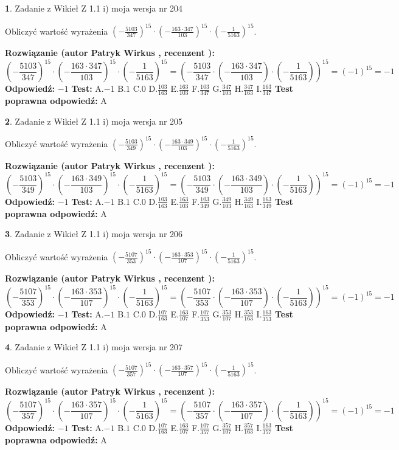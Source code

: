 \documentclass[12pt, a4paper]{article}
\theoremstyle{definition} %
\newtheorem{zad}{}
\newcommand{\zadStart}[1]{\begin{zad}#1\newline}
\newcommand{\zadStop}{\end{zad}}
\newcommand{\rozwStart}[2]{\noindent \textbf{Rozwiązanie (autor #1 , recenzent #2): }\newline}
\newcommand{\rozwStop}{\newline}
\newcommand{\odpStart}{\noindent \textbf{Odpowiedź:}\newline}
\newcommand{\odpStop}{\newline}
\newcommand{\testStart}{\noindent \textbf{Test:}\newline}
\newcommand{\testStop}{\newline}
\newcommand{\kluczStart}{\noindent \textbf{Test poprawna odpowiedź:}\newline}
\newcommand{\kluczStop}{\newline}
\begin{document}
\zadStart{Zadanie z Wikieł Z 1.1 i) moja wersja nr 204}

Obliczyć wartość wyrażenia $(-\frac{5103}{347})^{15} \cdot (-\frac{163 \cdot 347}{103})^{15} \cdot (-\frac{1}{5163})^{15}$.
\zadStop
\rozwStart{Patryk Wirkus}{}
$$(-\frac{5103}{347})^{15} \cdot (-\frac{163 \cdot 347}{103})^{15} \cdot (-\frac{1}{5163})^{15} = (-\frac{5103}{347} \cdot (-\frac{163 \cdot 347}{103}) \cdot (-\frac{1}{5163}))^{15} = (-1)^{15} = -1$$
\rozwStop
\odpStart
$-1$
\odpStop
\testStart
A.$-1$ B.$1$ C.$0$ D.$\frac{103}{163}$ E.$\frac{163}{103}$
F.$\frac{103}{347}$ G.$\frac{347}{103}$
H.$\frac{347}{163}$
I.$\frac{163}{347}$
\testStop
\kluczStart
A
\kluczStop



\zadStart{Zadanie z Wikieł Z 1.1 i) moja wersja nr 205}

Obliczyć wartość wyrażenia $(-\frac{5103}{349})^{15} \cdot (-\frac{163 \cdot 349}{103})^{15} \cdot (-\frac{1}{5163})^{15}$.
\zadStop
\rozwStart{Patryk Wirkus}{}
$$(-\frac{5103}{349})^{15} \cdot (-\frac{163 \cdot 349}{103})^{15} \cdot (-\frac{1}{5163})^{15} = (-\frac{5103}{349} \cdot (-\frac{163 \cdot 349}{103}) \cdot (-\frac{1}{5163}))^{15} = (-1)^{15} = -1$$
\rozwStop
\odpStart
$-1$
\odpStop
\testStart
A.$-1$ B.$1$ C.$0$ D.$\frac{103}{163}$ E.$\frac{163}{103}$
F.$\frac{103}{349}$ G.$\frac{349}{103}$
H.$\frac{349}{163}$
I.$\frac{163}{349}$
\testStop
\kluczStart
A
\kluczStop



\zadStart{Zadanie z Wikieł Z 1.1 i) moja wersja nr 206}

Obliczyć wartość wyrażenia $(-\frac{5107}{353})^{15} \cdot (-\frac{163 \cdot 353}{107})^{15} \cdot (-\frac{1}{5163})^{15}$.
\zadStop
\rozwStart{Patryk Wirkus}{}
$$(-\frac{5107}{353})^{15} \cdot (-\frac{163 \cdot 353}{107})^{15} \cdot (-\frac{1}{5163})^{15} = (-\frac{5107}{353} \cdot (-\frac{163 \cdot 353}{107}) \cdot (-\frac{1}{5163}))^{15} = (-1)^{15} = -1$$
\rozwStop
\odpStart
$-1$
\odpStop
\testStart
A.$-1$ B.$1$ C.$0$ D.$\frac{107}{163}$ E.$\frac{163}{107}$
F.$\frac{107}{353}$ G.$\frac{353}{107}$
H.$\frac{353}{163}$
I.$\frac{163}{353}$
\testStop
\kluczStart
A
\kluczStop



\zadStart{Zadanie z Wikieł Z 1.1 i) moja wersja nr 207}

Obliczyć wartość wyrażenia $(-\frac{5107}{357})^{15} \cdot (-\frac{163 \cdot 357}{107})^{15} \cdot (-\frac{1}{5163})^{15}$.
\zadStop
\rozwStart{Patryk Wirkus}{}
$$(-\frac{5107}{357})^{15} \cdot (-\frac{163 \cdot 357}{107})^{15} \cdot (-\frac{1}{5163})^{15} = (-\frac{5107}{357} \cdot (-\frac{163 \cdot 357}{107}) \cdot (-\frac{1}{5163}))^{15} = (-1)^{15} = -1$$
\rozwStop
\odpStart
$-1$
\odpStop
\testStart
A.$-1$ B.$1$ C.$0$ D.$\frac{107}{163}$ E.$\frac{163}{107}$
F.$\frac{107}{357}$ G.$\frac{357}{107}$
H.$\frac{357}{163}$
I.$\frac{163}{357}$
\testStop
\kluczStart
A
\kluczStop
\end{document}
